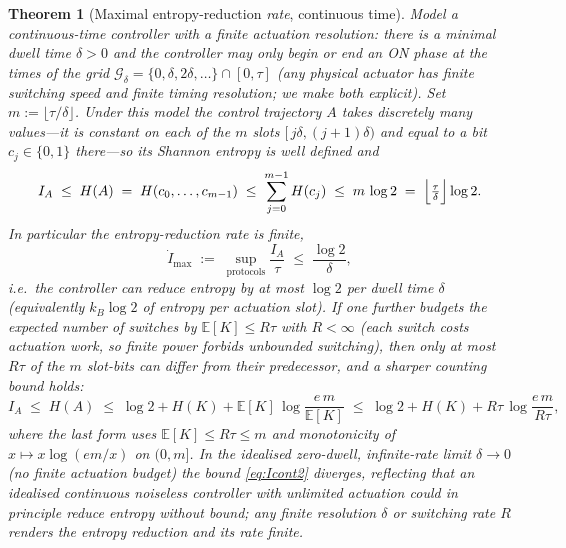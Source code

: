 \documentclass{amsart}
\newtheorem{theorem}{Theorem}
\theoremstyle{definition}
\newcommand{\E}{\mathbb{E}}
\newcommand{\kB}{k_{B}}
\begin{document}
\begin{theorem}[Maximal entropy-reduction \emph{rate}, continuous time]
\label{thm:Imax-cont}
Model a continuous-time controller with a finite actuation resolution: there is
a minimal dwell time $\delta>0$ and the controller may only \emph{begin or end}
an ON phase at the times of the grid
$\mathcal G_\delta=\{0,\delta,2\delta,\dots\}\cap[0,\tau]$ (any physical
actuator has finite switching speed and finite timing resolution; we make both
explicit). Set $m:=\lfloor\tau/\delta\rfloor$. Under this model the control
trajectory $A$ takes \emph{discretely many} values---it is constant on each of
the $m$ slots $[\,j\delta,(j+1)\delta)$ and equal to a bit $c_j\in\{0,1\}$
there---so its Shannon entropy is well defined and
\begin{equation}\label{eq:Icont2}
I_A\;\le\;H(A)\;=\;H(c_0,\dots,c_{m-1})\;\le\;\sum_{j=0}^{m-1}H(c_j)\;\le\; m\,\log 2
\;=\;\Bigl\lfloor\tfrac{\tau}{\delta}\Bigr\rfloor\log 2 .
\end{equation}
In particular the entropy-reduction \emph{rate} is finite,
\begin{equation}\label{eq:Icont}
\dot I_{\max}\;:=\;\sup_{\text{protocols}}\frac{I_A}{\tau}\;\le\;\frac{\log 2}{\delta},
\end{equation}
i.e.\ the controller can reduce entropy by at most $\log2$ per dwell time
$\delta$ (equivalently $\kB\log2$ of entropy per actuation slot). If one further
budgets the \emph{expected number of switches} by $\E[K]\le R\tau$ with
$R<\infty$ (each switch costs actuation work, so finite power forbids unbounded
switching), then only at most $R\tau$ of the $m$ slot-bits can differ from their
predecessor, and a sharper counting bound holds:
\begin{equation}\label{eq:Icont3}
I_A\;\le\;H(A)\;\le\;\log2 + H(K) + \E[K]\,\log\frac{e\,m}{\E[K]}
\;\le\;\log2 + H(K) + R\tau\,\log\frac{e\,m}{R\tau},
\end{equation}
where the last form uses $\E[K]\le R\tau\le m$ and monotonicity of
$x\mapsto x\log(em/x)$ on $(0,m]$. In the idealised zero-dwell, infinite-rate
limit $\delta\to0$ (no finite actuation budget) the bound \eqref{eq:Icont2}
diverges, reflecting that an idealised continuous noiseless controller with
unlimited actuation could in principle reduce entropy without bound; \emph{any}
finite resolution $\delta$ or switching rate $R$ renders the entropy reduction
and its rate finite.
\end{theorem}
\end{document}
